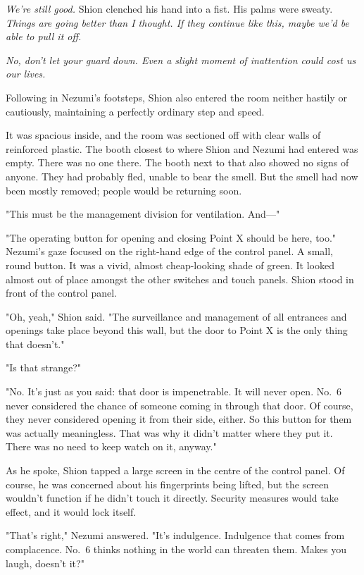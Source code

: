 \emph{We're still good.} Shion clenched his hand into a fist. His palms were
sweaty. \emph{Things are going better than I thought. If they continue like
this, maybe we'd be able to pull it off.}

\emph{No, don't let your guard down. Even a slight moment of inattention could
cost us our lives.}

Following in Nezumi's footsteps, Shion also entered the room neither
hastily or cautiously, maintaining a perfectly ordinary step and speed.

It was spacious inside, and the room was sectioned off with clear walls
of reinforced plastic. The booth closest to where Shion and Nezumi had
entered was empty. There was no one there. The booth next to that also
showed no signs of anyone. They had probably fled, unable to bear the
smell. But the smell had now been mostly removed; people would be
returning soon.

"This must be the management division for ventilation. And---"

"The operating button for opening and closing Point X should be here,
too." Nezumi's gaze focused on the right-hand edge of the control panel.
A small, round button. It was a vivid, almost cheap-looking shade of
green. It looked almost out of place amongst the other switches and
touch panels. Shion stood in front of the control panel.

"Oh, yeah," Shion said. "The surveillance and management of all
entrances and openings take place beyond this wall, but the door to
Point X is the only thing that doesn't."

"Is that strange?"

"No. It's just as you said: that door is impenetrable. It will never
open. No.~6 never considered the chance of someone coming in through
that door. Of course, they never considered opening it from their side,
either. So this button for them was actually meaningless. That was why
it didn't matter where they put it. There was no need to keep watch on
it, anyway."

As he spoke, Shion tapped a large screen in the centre of the
control panel. Of course, he was concerned about his fingerprints being
lifted, but the screen wouldn't function if he didn't touch it directly.
Security measures would take effect, and it would lock itself.

"That's right," Nezumi answered. "It's indulgence. Indulgence that comes
from complacence. No.~6 thinks nothing in the world can threaten them.
Makes you laugh, doesn't it?"

